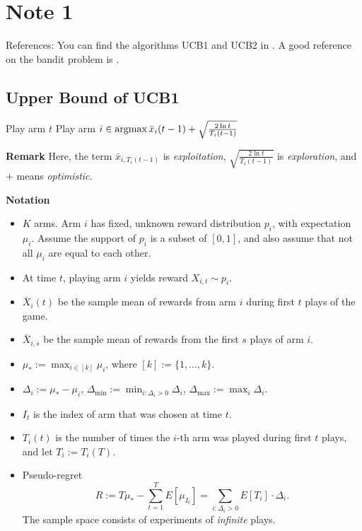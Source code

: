\section{Note 1}

References: You can find the algorithms UCB1 and UCB2 in \cite{Auer2002}.
A good reference on the bandit problem is \cite{MAL024}.

\subsection{Upper Bound of UCB1} %

\begin{alg}[UCB1] \leavevmode
    \begin{framed}
        \begin{algorithmic}
                \State Play arm $t$
            \EndFor
                \State Play arm $i\in\mathop{\mathrm{argmax}} \bar x_{i}(t-1) + \sqrt{\frac{2\ln t}{T_i(t-1)}}$
            \EndFor
        \end{algorithmic}
    \end{framed}
\end{alg}

\textbf{Remark}
Here,
the term $\bar x_{i,T_i(t-1)}$ is \emph{exploitation},
$\sqrt{\frac{2\ln t}{T_i(t-1)}}$ is \emph{exploration},
and $+$ means \emph{optimistic}.

\textbf{Notation}
\begin{itemize}
    \item $K$ arms.
        Arm $i$ has fixed, unknown reward distribution $p_i$,
        with expectation $\mu_i$.
        Assume the support of $p_i$ is a subset of $[0,1]$, and
        also assume that not all $\mu_i$ are equal to each other.
    \item At time $t$, playing arm $i$ yields reward $X_{i,t}\sim p_i$.
    \item $\bar X_{i}(t)$ be the sample mean of rewards from arm $i$ during first $t$ plays of the game.
    \item $\bar X_{i,s}$ be the sample mean of rewards from the first $s$ plays of arm $i$.
    \item $\mu_*:=\max_{i\in[k]}\mu_i$, where $[k]:=\{1,\dots,k\}$.
    \item $\Delta_i:=\mu_* - \mu_i$,
        $\Delta_{\text{min}}:=\min_{i:\Delta_i>0}\Delta_i$,
        $\Delta_{\text{max}}:=\max_i \Delta_i$.
    \item $I_t$ is the index of arm that was chosen at time $t$.
    \item $T_i(t)$ is the number of times the $i$-th arm was played during first $t$ plays,
        and let $T_i:=T_i(T)$.
    \item Pseudo-regret
        \begin{equation}
            R:=T\mu_*-\sum_{t=1}^T E[\mu_{I_t}]
            = \sum_{i:\Delta_i>0} E[T_i]\cdot\Delta_i.
        \end{equation}
        The sample space consists of experiments of \emph{infinite} plays.
\end{itemize}
\


